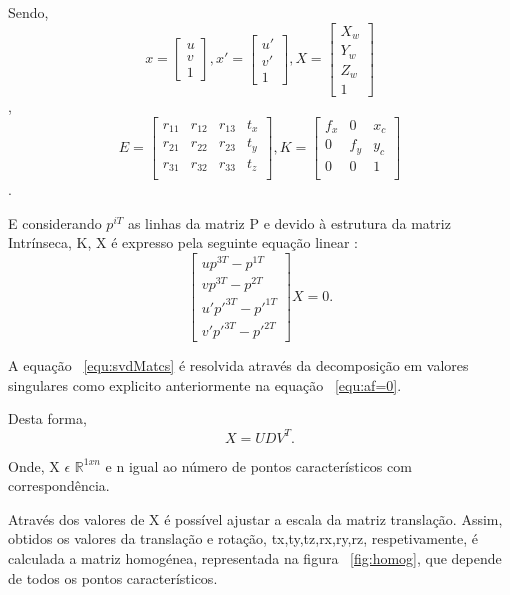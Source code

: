 Sendo, \[ x =  \left[ \begin{array}{ccc} u \\ v \\ 1 \end{array} \right],  x' =  \left[ \begin{array}{ccc} u' \\ v' \\ 1 \end{array} \right] ,  X =  \left[ \begin{array}{cccc} X_w \\ Y_w \\ Z_w \\ 1 \end{array} \right] \], \[ E =  \left[ \begin{array}{cccc} r_{11} & r_{12} & r_{13} & t_{x} \\ r_{21} & r_{22} & r_{23} & t_{y} \\ r_{31} & r_{32} & r_{33} & t_{z} \\ \end{array} \right] , K =  \left[ \begin{array}{ccc} f_x & 0 & x_c \\ 0 & f_y & y_c \\ 0 & 0 & 1 \\ \end{array} \right] \].

E considerando $p^{iT}$ as linhas da matriz P e devido à estrutura da matriz Intrínseca, K, X é expresso pela seguinte equação linear :  \begin{equation}\label{equ:svdMatcs} 
\left[ \begin{array}{cccc}
up^{3T} - p^{1T} \\
vp^{3T} - p^{2T} \\
u'p'^{3T} - p'^{1T} \\
v'p'^{3T} - p'^{2T} 
\end{array} \right] X = 0 .
\end{equation}

A equação ~\ref{equ:svdMatcs} é resolvida através da decomposição em valores singulares como explicito anteriormente na equação ~\ref{equ:af=0}.

Desta forma, \[ X = UDV^T. \] 

Onde, X $\epsilon$ $\mathbb{R}^{1xn}$ e n igual ao número de pontos característicos com correspondência.

Através dos valores de X é possível ajustar a escala da matriz translação. Assim, obtidos os valores da translação e rotação, tx,ty,tz,rx,ry,rz, respetivamente, é calculada a matriz homogénea, representada na figura ~\ref{fig:homog}, que depende de todos os pontos característicos.

